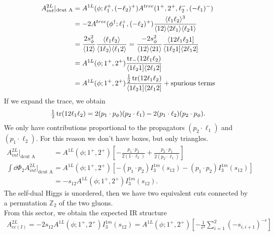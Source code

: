 \documentclass{article}
\numberwithin{equation}{section}
\newcommand{\Z}{\mathbb{Z}}
\begin{document}
\begin{align*}
	A^{2L}_{int}|_{\text{dcut A}}&=A^{1L}(\phi;\ell_1^+,(-\ell_2)^+)A^{tree}(1^+,2^+,\ell_2^-,(-\ell_1)^-)\\
	&=-2  A^{tree}(\phi^\dagger;\ell_1^+,(-\ell_2)^+)\frac{\langle \ell_1 \ell_2 \rangle^3}{\langle 12 \rangle \langle 2\ell_1 \rangle  \langle \ell_2 1 \rangle}\\
	&=\frac{2 s_\phi^2}{\langle 12 \rangle} \frac{\langle \ell_1 \ell_2 \rangle}{\langle 1 \ell_2 \rangle \langle \ell_1 2 \rangle}=\frac{-2 s_\phi^2}{ \langle 12 \rangle \langle 21 \rangle} \frac{\langle 12 \ell_1 \ell_2 1]}{\langle 1 \ell_2 1] \langle 2 \ell_1 2]}\\
	&=A^{1L}(\phi;1^+,2^+)\frac{\tr_-(12\ell_1\ell_2)}{\langle 1 \ell_2 1] \langle 2 \ell_1 2]}\\&=A^{1L}(\phi;1^+,2^+)\frac{\tfrac{1}{2}\tr(12\ell_1\ell_2)}{\langle 1 \ell_2 1] \langle 2 \ell_1 2]}+\text{spurious terms}
\end{align*}
If we expand the trace, we obtain
\begin{align*}
	\tfrac{1}{2}\tr(12\ell_1\ell_2)=2(p_1 \cdot p_\phi)(p_2\cdot \ell_1)-2(p_1 \cdot \ell_2)(p_2\cdot p_\phi).
\end{align*}
We only have contributions proportional to the propagators $(p_2\cdot \ell_1)$ and $(p_1 \cdot \ell_2)$. For this reason we don't have boxes, but only triangles.
\begin{align*}
	A^{2L}_{int}|_{\text{dcut A}}&=A^{1L}(\phi;1^+,2^+)\left[-\frac{p_1\cdot p_2}{2(1\cdot \ell_2)}+\frac{p_2\cdot p_1}{2(p_2 \cdot \ell_1)}\right]\\
	\int \dd \Phi_2 A^{2L}_{int}|_{\text{dcut A}}&=A^{1L}(\phi;1^+,2^+)\left[-(p_1\cdot p_2) I_3^{1m}(s_{12})-(p_1\cdot p_2)I_3^{1m}(s_{12})\right]\\
		&=-s_{12}A^{1L}(\phi;1^+,2^+) I_3^{1m}(s_{12}).
\end{align*}
The self-dual Higgs is unordered, then we have two equivalent cuts connected by a permutation $\Z_2$ of the two gluons.\\
From this sector, we obtain the expected IR structure
\begin{align*}
	A^{2L}_{cc(I)}=-2 s_{12} A^{1L}(\phi;1^+,2^+) I_{3}^{1m}(s_{12})=A^{1L}(\phi;1^+,2^+) \left[-\frac{1}{\epsilon^2}\sum_{i=1}^2 (-s_{i,i+1})^{-\epsilon}\right]
\end{align*}
\end{document}
